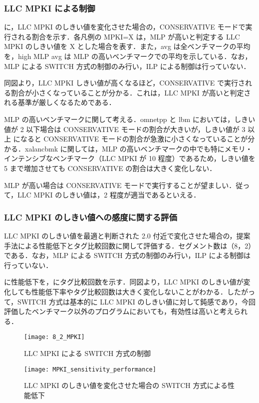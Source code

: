 \subsubsection{LLC MPKI による制御}
に，LLC MPKI のしきい値を変化させた場合の，CONSERVATIVE モードで実行される割合を示す．各凡例の MPKI=X は，MLP が高いと判定する LLC MPKI のしきい値を X とした場合を表す．また，avg は全ベンチマークの平均を，high MLP avg は MLP の高いベンチマークでの平均を示している．なお，MLP による SWITCH 方式の制御のみ行い，ILP による制御は行っていない．


同図より，LLC MPKI しきい値が高くなるほど，CONSERVATIVE で実行される割合が小さくなっていることが分かる．これは，LLC MPKI が高いと判定される基準が厳しくなるためである．

MLP の高いベンチマークに関して考える．omnetpp と lbm においては，しきい値が 2 以下場合は CONSERVATIVE モードの割合が大きいが，しきい値が 3 以上 になると CONSERVATIVE モードの割合が急激に小さくなっていることが分かる．xalancbmk に関しては，MLP の高いベンチマークの中でも特にメモリ・インテンシブなベンチマーク（LLC MPKI が 10 程度）であるため，しきい値を 5 まで増加させても CONSERVATIVE の割合は大きく変化しない．

MLP が高い場合は CONSERVATIVE モードで実行することが望ましい．従って，LLC MPKI のしきい値は，2 程度が適当であるといえる．

\subsubsection{LLC MPKI のしきい値への感度に関する評価}
LLC MPKI のしきい値を最適と判断された 2.0 付近で変化させた場合の，提案手法による性能低下とタグ比較回数に関して評価する．セグメント数は（8，2）である．なお，MLP による SWITCH 方式の制御のみ行い，ILP による制御は行っていない．

に性能低下を，にタグ比較回数を示す．同図より，LLC MPKI のしきい値が変化しても性能低下率やタグ比較回数は大きく変化しないことがわかる．したがって，SWITCH 方式は基本的に LLC MPKI のしきい値に対して鈍感であり，今回評価したベンチマーク以外のプログラムにおいても，有効性は高いと考えられる．

\begin{figure}[htb]
  \centering
  \texttt{[image: 8\_2\_MPKI]}
  \caption{LLC MPKI による SWITCH 方式の制御}
  \label{fig:switch_MPKI_rate}
\end{figure}

  \begin{figure}[htb]
  \centering
  \texttt{[image: MPKI\_sensitivity\_performance]}
  \caption{LLC MPKI のしきい値を変化させた場合の SWITCH 方式による性能低下}
  \label{fig:MPKI_sensitivity_performance}
\end{figure}

